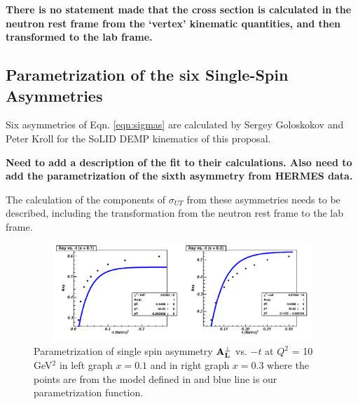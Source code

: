 {\bf There is no statement made that the cross section is calculated in the
  neutron rest frame from the `vertex' kinematic quantities, and then
  transformed to the lab frame.}

\subsection{Parametrization of the six Single-Spin Asymmetries
\label{sec:sixparametrizations}}

Six asymmetries of Eqn. \ref{eqn:sigmas} are calculated by Sergey 
Goloskokov and Peter Kroll for the SoLID DEMP kinematics of this proposal.

{\bf
Need to add a description of the fit to their calculations.  Also need to add
the parametrization of the sixth asymmetry from HERMES data.

The calculation of the components of $\sigma_{UT}$ from these asymmetries needs
to be described, including the transformation from the neutron rest frame to
the lab frame.
}

\begin{figure}[!hbt]
    \centering
    \includegraphics[width=6.0in,height=1.45in]{./figures/asym_3.pdf}
    \caption{ Parametrization of single spin asymmetry $\bf{A_{L}^{\perp}}$
      vs. $-t$ at $Q^2$ = 10 GeV$^2$ in left graph $x = 0.1$ and in right graph
      $x = 0.3$ where the points are from the model defined in \cite{Fr00} and
      blue line is our parametrization function.}
    \label{fig:asym-1}
\end{figure}


